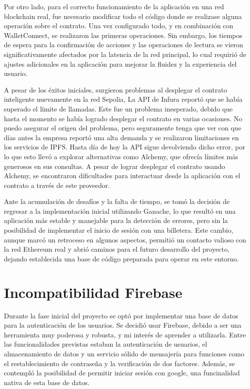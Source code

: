 Por otro lado, para el correcto funcionamiento de la aplicación en una red blockchain real, fue necesario modificar todo el código donde se realizase alguna operación sobre el contrato.
Una vez configurado todo, y en combinación con WalletConnect, se realizaron las primeras operaciones. Sin embargo, los tiempos de espera para la confirmación de acciones y las operaciones de lectura se vieron significativamente afectados por la latencia de la red principal, lo cual requirió de ajustes adicionales en la aplicación para mejorar la fluidez y la experiencia del usuario.

A pesar de los éxitos iniciales, surgieron problemas al desplegar el contrato inteligente nuevamente en la red Sepolia, La API de Infura reportó que se había superado el límite de llamadas. 
Este fue un problema inesperado, debido que hasta el momento se había logrado desplegar el contrato en varias ocasiones. 
No puedo asegurar el origen del problema, pero seguramente tenga que ver con que días antes la empresa reportó una alta demanda y se realizaron limitaciones en los servicios de IPFS. 
Hasta día de hoy la API sigue devolviendo dicho error, por lo que esto llevó a explorar alternativas como Alchemy, que ofrecía límites más generosos en sus consultas. 
A pesar de lograr desplegar el contrato usando Alchemy, se encontraron dificultades para interactuar desde la aplicación con el contrato a través de este proveedor.

Ante la acumulación de desafíos y la falta de tiempo, se tomó la decisión de regresar a la implementación inicial utilizando Ganache, lo que resultó en una aplicación más estable y manejable para la detección de errores, pero sin la posibilidad de implementar el inicio de sesión con una billetera. Este cambio, aunque marcó un retroceso en algunos aspectos, permitió un contacto valioso con la red Ethereum real y abrió caminos para el futuro desarrollo del proyecto, dejando establecida una base de código preparada para operar en este entorno.



\section{Incompatibilidad Firebase}

Durante la fase inicial del proyecto se optó por implementar una base de datos para la autenticación de los usuarios.
Se decidió usar Firebase, debido a ser una herramienta muy poderosa y robusta, y mi interés de aprender a utilizarla. Entre las funcionalidades previstas estaban la autenticación de usuarios, el almacenamiento de datos y un servicio sólido de mensajería para funciones como el restablecimiento de contraseña y la verificación de dos factores.
Además, se contempló la posibilidad de permitir iniciar sesión con google, una funcinalidad nativa de esta base de datos.

